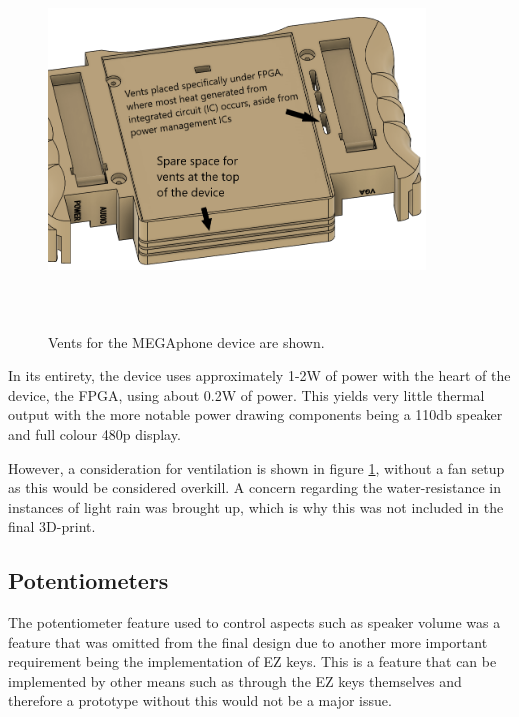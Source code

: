 \begin{figure} [h]
    \centering
    \includegraphics[width=10cm,height=10cm,keepaspectratio]{Figures/ventilation.png}
    \caption{Vents for the MEGAphone device are shown.}
    \label{fig:Vents}
\end{figure}

In its entirety, the device uses approximately 1-2W of power with the heart of the device, the FPGA, using about 0.2W of power.
This yields very little thermal output with the more notable power drawing components being a 110db speaker and full colour 480p display.

However, a consideration for ventilation is shown in figure \ref{fig:Vents}, without a fan setup as this would be considered overkill.
A concern regarding the water-resistance in instances of light rain was brought up, which is why this was not included in the final 3D-print.

\subsection{Potentiometers}

The potentiometer feature used to control aspects such as speaker volume was a feature that was omitted from the final design due to another more important requirement being the implementation of EZ keys.
This is a feature that can be implemented by other means such as through the EZ keys themselves and therefore a prototype without this would not be a major issue.

